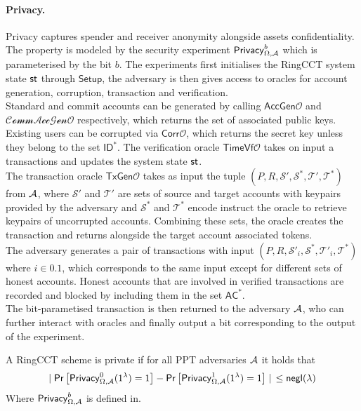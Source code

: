 \paragraph*{Privacy.} Privacy captures spender and receiver anonymity alongside assets confidentiality. The property is modeled by the security experiment $\mathsf{Privacy}_{\Omega,\mathcal{A}}^b$ which is parameterised by the bit $b$. The experiments first initialises the RingCCT system state $\st$ through $\mathsf{Setup}$, the adversary is then gives access to oracles for account generation, corruption, transaction and verification. \\
Standard and commit accounts can be generated by calling $\mathsf{AccGen}\mathcal{O}$ and $\mathcal{CommAccGen}\mathcal{O}$ respectively, which returns the set of associated public keys. Existing users can be corrupted via $\mathsf{Corr}\mathcal{O}$, which returns the secret key unless they belong to the set $\mathsf{ID}^*$. The verification oracle $\mathsf{TimeVf}\mathcal{O}$ takes on input a transactions and updates the system state $\st$. \\
The transaction oracle $\mathsf{TxGen}\mathcal{O}$ takes as input the tuple $(P, R, \mathcal{S}', \mathcal{S}^*, \mathcal{T}', \mathcal{T}^*)$ from $\mathcal{A}$, where $\mathcal{S}'$ and $\mathcal{T}'$ are sets of source and target accounts with keypairs provided by the adversary and $\mathcal{S}^*$ and $\mathcal{T}^*$ encode instruct the oracle to retrieve keypairs of uncorrupted accounts. Combining these sets, the oracle creates the transaction and returns alongside the target account associated tokens. \\
The adversary generates a pair of transactions with input $(P, R, \mathcal{S}'_i, \mathcal{S}^*, \mathcal{T}'_i, \mathcal{T}^*)$ where $i \in {0.1}$, which corresponds to the same input except for  different sets of honest accounts. Honest accounts that are involved in verified transactions are recorded and blocked by including them in the set $\mathsf{AC}^*$. \\
The bit-parametised transaction is then returned to the adversary $\mathcal{A}$, who can further interact with oracles and finally output a bit corresponding to the output of the experiment.

\begin{definition}[Privacy] A RingCCT scheme is private if for all PPT adversaries $\mathcal{A}$ it holds that
\begin{equation*}
\mid \mathsf{Pr}\left[\mathsf{Privacy}_{\Omega,\adv}^0(1^\lambda) = 1\right] -  \mathsf{Pr}\left[\mathsf{Privacy}_{\Omega,\adv}^1(1^\lambda) = 1\right] \mid \:\: \leq \negl
\end{equation*}
Where $\mathsf{Privacy}_{\Omega,\mathcal{A}}^b$ is defined in. 
\end{definition}

